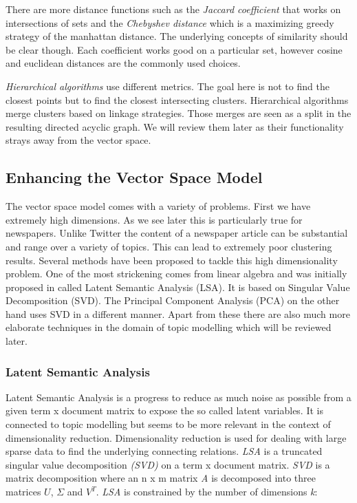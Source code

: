     There are more distance functions such as the \emph{Jaccard coefficient} that works on intersections of sets and the \emph{Chebyshev distance} which is a maximizing greedy strategy of the manhattan distance. The underlying concepts of similarity should be clear though. Each coefficient works good on a particular set, however cosine and euclidean distances are the commonly used choices.

    \emph{Hierarchical algorithms} use different metrics. The goal here is not to find the closest points but to find the closest intersecting clusters. Hierarchical algorithms merge clusters based on linkage strategies. Those merges are seen as a split in the resulting directed acyclic graph. We will review them later as their functionality strays away from the vector space.

  \subsection{Enhancing the Vector Space Model}

    The vector space model comes with a variety of problems. First we have extremely high dimensions. As we see later this is particularly true for newspapers. Unlike Twitter the content of a newspaper article can be substantial and range over a variety of topics. This can lead to extremely poor clustering results. Several methods have been proposed to tackle this high dimensionality problem. One of the most strickening comes from linear algebra and was initially proposed in \cite{DeerwesterLSI1990} called Latent Semantic Analysis (LSA). It is based on Singular Value Decomposition (SVD). The Principal Component Analysis (PCA) on the other hand uses SVD in a different manner. Apart from these there are also much more elaborate techniques in the domain of topic modelling which will be reviewed later.

    \subsubsection{Latent Semantic Analysis}
      Latent Semantic Analysis is a progress to reduce as much noise as possible from a given term x document matrix to expose the so called latent variables. It is connected to topic modelling but seems to be more relevant in the context of dimensionality reduction. Dimensionality reduction is used for dealing with large sparse data to find the underlying connecting relations. \emph{LSA} is a truncated singular value decomposition \emph{(SVD)} on a term x document matrix. \emph{SVD} is a matrix decomposition where an n x m matrix \emph{A} is decomposed into three matrices $U$, $\Sigma$ and $V^{T}$. \emph{LSA} is constrained by the number of dimensions \emph{k}:

